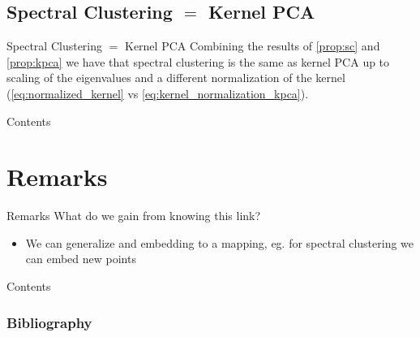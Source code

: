 \documentclass[aspectratio=169]{beamer}
\begin{document}
\subsection{Spectral Clustering \texorpdfstring{$=$}{TEXT} Kernel PCA}
\begin{frame}{Spectral Clustering \texorpdfstring{$=$}{TEXT} Kernel PCA}
  Combining the results of \cref{prop:sc} and \cref{prop:kpca} we have that spectral clustering is the same as kernel PCA up to scaling of the eigenvalues and a different normalization of the kernel (\cref{eq:normalized_kernel} vs \cref{eq:kernel_normalization_kpca}).
\end{frame}
\begin{frame}{Contents}
  \tableofcontents
\end{frame}

\section{Remarks}
\begin{frame}{Remarks}
  What do we gain from knowing this link?
  \begin{itemize}
    \item We can generalize and embedding to a mapping, eg. for spectral clustering we can embed new points 
  \end{itemize}
\end{frame}

\begin{frame}{Contents}
  \tableofcontents
\end{frame}
\begin{frame}
  \frametitle{Bibliography}
  \printbibliography
  \end{frame}
\end{document}

